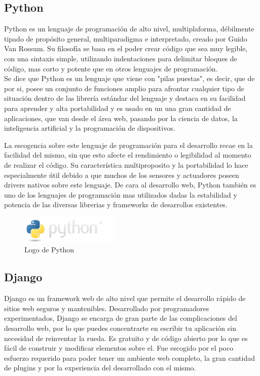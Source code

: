 \subsection{Python}
Python es un lenguaje de programación de alto nivel, multiplaforma,  débilmente tipado de propósito general, multiparadigma e interpretado\cite{whatspython}, creado por Guido Van Rossum. Su filosofía se basa en el poder crear código que sea muy legible, con una sintaxis simple, utilizando indentaciones para delimitar bloques de código, mas corto y potente que en otros lenguajes de programación.\cite{Guido}\\

Se dice que Python es un lenguaje que viene con "pilas puestas"\cite{pep206}, es decir, que de por si, posee un conjunto de funciones amplio para afrontar cualquier tipo de situación dentro de las librería estándar del lenguaje y destaca en su facilidad para aprender y alta portabilidad y es usado en un una gran cantidad de aplicaciones, que van desde el área web, pasando por la ciencia de datos, la inteligencia artificial y la programación de dispositivos. 

La escogencia sobre este lenguaje de programación para el desarrollo recae en la facilidad del mismo, sin que esto afecte el rendimiento o legibilidad al momento de realizar el código. Su característica multiproposito y la portabilidad lo hace especialmente útil debido a que muchos de los sensores y actuadores poseen drivers nativos sobre este lenguaje. De cara al desarrollo web, Python también es uno de los lenguajes de programación mas utilizados dadas la estabilidad y potencia de las diversas librerias y frameworks de desarrollos existentes.

\begin{figure}[ht]
\centering
\includegraphics[width=0.425\textwidth]{Figuras/python-logo.png}
\caption{\label{fig:python-logo}Logo de Python}
\vspace*{-10pt}
\end{figure}

\subsection{Django}
Django es un framework web de alto nivel que permite el desarrollo rápido de sitios web seguros y mantenibles. Desarrollado por programadores experimentados, Django se encarga de gran parte de las complicaciones del desarrollo web, por lo que puedes concentrarte en escribir tu aplicación sin necesidad de reinventar la rueda. Es gratuito y de código abierto por lo que es fácil de construir y modificar elementos sobre el. Fue escogido por el poco esfuerzo requerido para poder tener un ambiente web completo, la gran cantidad de plugins y por la experiencia del desarrollado con el mismo.

